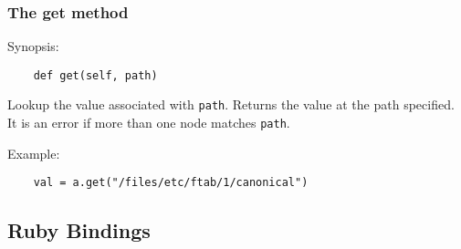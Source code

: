 \subsubsection{The get method}

Synopsis:

\begin{verbatim}
    def get(self, path)
\end{verbatim}

Lookup the value associated with \verb!path!. Returns the value at the path specified. It is an error if more than one node matches \verb!path!.

Example:

\begin{verbatim}
    val = a.get("/files/etc/ftab/1/canonical")
\end{verbatim}

\subsection{Ruby Bindings}






